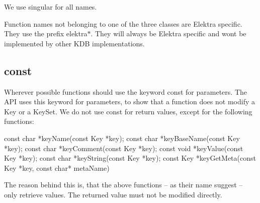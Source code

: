 We use singular for all names.

Function names not belonging to one of the three classes are Elektra specific. They use the prefix {\ttfamily elektra$\ast$}. They will always be Elektra specific and won\textquotesingle{}t be implemented by other K\+DB implementations.

\subsection*{const}

Wherever possible functions should use the keyword {\ttfamily const} for parameters. The A\+PI uses this keyword for parameters, to show that a function does not modify a {\ttfamily Key} or a {\ttfamily Key\+Set}. We do not use {\ttfamily const} for return values, except for the following functions\+: \begin{DoxyVerb}    const char *keyName(const Key *key);
    const char *keyBaseName(const Key *key);
    const char *keyComment(const Key *key);
    const void *keyValue(const Key *key);
    const char *keyString(const Key *key);
    const Key  *keyGetMeta(const Key *key, const char* metaName)
\end{DoxyVerb}


The reason behind this is, that the above functions – as their name suggest – only retrieve values. The returned value must not be modified directly. 
